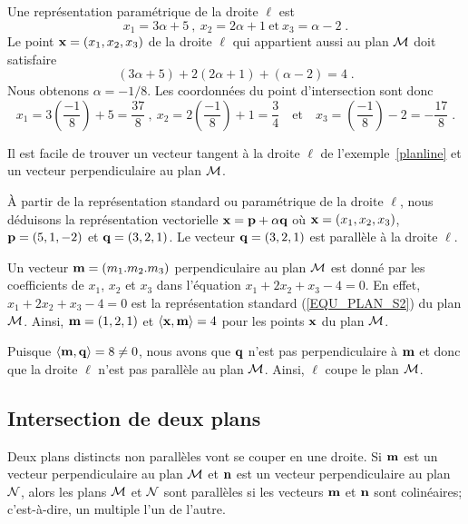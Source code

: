 {\begin{egg}
Une représentation paramétrique de la droite $\ell$ est
\[
x_1 = 3\alpha +5 \ , \ x_2 = 2\alpha + 1 \ \text{et} \ x_3= \alpha - 2 \; .
\]
Le point $\mathbf{x} = (x_1,x_2,x_3)$ de la droite $\ell$ qui appartient
aussi au plan $\cal M$ doit satisfaire
\[
(3\alpha +5) + 2(2\alpha + 1) + (\alpha - 2) = 4 \; .
\]
Nous obtenons $\alpha = -1/8$.  Les coordonnées du point d'intersection
sont donc
\[
x_1 = 3\left(\frac{-1}{8}\right)+5 = \frac{37}{8} \ , \ 
x_2 = 2\left(\frac{-1}{8}\right) + 1 = \frac{3}{4} \quad \text{et} \quad
x_3 = \left(\frac{-1}{8}\right) - 2 = -\frac{17}{8} \; .
\]
\label{planline}
\end{egg}

\begin{rmk}
Il est facile de trouver un vecteur tangent à la droite $\ell$ de
l'exemple~\ref{planline} et un vecteur perpendiculaire au plan
$\cal M$. 

À partir de la représentation standard ou paramétrique de la droite
$\ell$, nous déduisons la représentation vectorielle
$\mathbf{x} = \mathbf{p} + \alpha \mathbf{q}$ où $\mathbf{x} = (x_1,x_2,x_3)$,
$\mathbf{p} = (5,1,-2)$ et $\mathbf{q} = (3,2,1)$.  Le vecteur
$\mathbf{q} = (3,2,1)$ est parallèle à la droite $\ell$.

Un vecteur $\mathbf{m} = (m_1.m_2.m_3)$ perpendiculaire au plan $\cal M$
est donné par les coefficients de $x_1$, $x_2$ et $x_3$ dans l'équation
$x_1+2x_2+x_3-4 = 0$.  En effet, $x_1+2x_2+x_3-4 = 0$ est la représentation
standard (\ref{EQU_PLAN_S2}) du plan $\cal M$.  Ainsi,
$\mathbf{m} = (1,2,1)$ et $\left\langle{\mathbf{x}} , {\mathbf{m}}\right\rangle = 4$ 
pour les points $\mathbf{x}$ du plan $\cal M$.

Puisque $\left\langle{\mathbf{m}} , {\mathbf{q}}\right\rangle = 8 \neq 0$, nous avons que $\mathbf{q}$ n'est
pas perpendiculaire à $\mathbf{m}$ et donc que la droite $\ell$
n'est pas parallèle au plan $\cal M$.  Ainsi, $\ell$ coupe le plan
$\cal M$.
\end{rmk}

\subsection{Intersection de deux plans}

Deux plans distincts non parallèles vont se couper en une droite.  Si
$\mathbf{m}$ est un vecteur perpendiculaire au plan $\cal M$ et $\mathbf{n}$
est un vecteur perpendiculaire au plan $\cal N$, alors les plans
$\cal M$ et $\cal N$ sont parallèles si les vecteurs $\mathbf{m}$ et $\mathbf{n}$
sont colinéaires; c'est-à-dire, un multiple l'un de l'autre.

}
